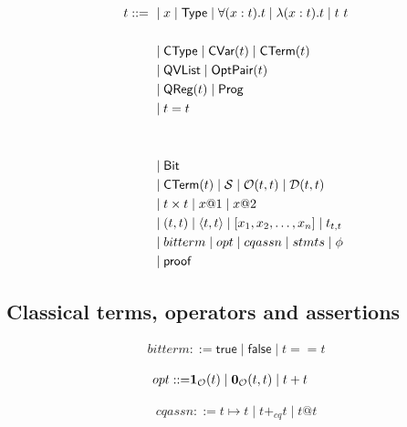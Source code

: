 \newcommand{\true}{\textsf{true}}
\newcommand{\false}{\textsf{false}}

\begin{definition}
    \begin{align*}
        t ::=\ & \mid x \mid \textsf{Type} \mid \forall (x : t). t \mid \lambda (x : t). t \mid t\ t\\
        \\
        & \mid \textsf{CType} \mid \textsf{CVar}(t) \mid \textsf{CTerm}(t) \\
        & \mid \textsf{QVList} \mid \textsf{OptPair}(t) \\
        & \mid \textsf{QReg}(t) \mid \textsf{Prog} \\
        & \mid t = t \\
        \\
        \\
        & \mid \textsf{Bit} \\
        & \mid \textsf{CTerm}(t) \mid \mathcal{S} \mid \mathcal{O}(t, t) \mid \mathcal{D}(t, t) \\
        & \mid t \times t \mid  x@1 \mid x@2 \\ 
        & \mid (t, t) \mid \langle t, t \rangle \mid [x_1, x_2, \dots, x_n] \mid t_{t,t} \\
        & \mid bitterm \mid opt \mid cqassn \mid stmts \mid \phi \\
        & \mid \textsf{proof}
    \end{align*}
\end{definition}

\subsection{Classical terms, operators and assertions}

\begin{definition}
    \begin{align*}
        bitterm ::= \true \mid \false \mid t == t
    \end{align*}
\end{definition}

\begin{definition}
    \begin{align*}
        opt ::= & \mathbf{1}_\mathcal{O}(t) \mid \mathbf{0}_\mathcal{O}(t,t) \mid t + t
    \end{align*}
\end{definition}

\begin{definition}
    \begin{align*}
        cqassn ::= t\mapsto t \mid t +_{cq} t \mid t @ t
    \end{align*}
\end{definition}

